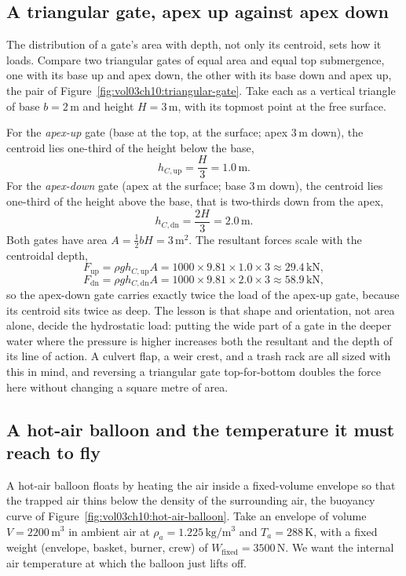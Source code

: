 \subsection{A triangular gate, apex up against apex down}

The distribution of a gate's area with depth, not only its centroid, sets
how it loads. Compare two triangular gates of equal area and equal top
submergence, one with its base up and apex down, the other with its base
down and apex up, the pair of Figure~\ref{fig:vol03ch10:triangular-gate}.
Take each as a vertical triangle of base $b = 2\,\si{\meter}$ and height
$H = 3\,\si{\meter}$, with its topmost point at the free surface.

For the \emph{apex-up} gate (base at the top, at the surface; apex $3\,\si{
\meter}$ down), the centroid lies one-third of the height below the base,
\[
h_{C,\text{up}} = \frac{H}{3} = 1.0\,\si{\meter}.
\]
For the \emph{apex-down} gate (apex at the surface; base $3\,\si{\meter}$
down), the centroid lies one-third of the height above the base, that is
two-thirds down from the apex,
\[
h_{C,\text{dn}} = \frac{2H}{3} = 2.0\,\si{\meter}.
\]
Both gates have area $A = \tfrac12 b H = 3\,\text{m}^2$. The resultant
forces scale with the centroidal depth,
\[
F_{\text{up}} = \rho g h_{C,\text{up}} A
= 1000 \times 9.81 \times 1.0 \times 3 \approx 29.4\,\text{kN},
\]
\[
F_{\text{dn}} = \rho g h_{C,\text{dn}} A
= 1000 \times 9.81 \times 2.0 \times 3 \approx 58.9\,\text{kN},
\]
so the apex-down gate carries exactly twice the load of the apex-up gate,
because its centroid sits twice as deep. The lesson is that shape and
orientation, not area alone, decide the hydrostatic load: putting the wide
part of a gate in the deeper water where the pressure is higher increases
both the resultant and the depth of its line of action. A culvert flap, a
weir crest, and a trash rack are all sized with this in mind, and reversing
a triangular gate top-for-bottom doubles the force here without changing a
square metre of area.



\subsection{A hot-air balloon and the temperature it must reach to fly}

A hot-air balloon floats by heating the air inside a fixed-volume envelope
so that the trapped air thins below the density of the surrounding air, the
buoyancy curve of Figure~\ref{fig:vol03ch10:hot-air-balloon}. Take an
envelope of volume $V = 2200\,\text{m}^3$ in ambient air at $\rho_a =
1.225\,\si{\kilogram\per\meter\cubed}$ and $T_a = 288\,\text{K}$, with a
fixed weight (envelope, basket, burner, crew) of $W_{\text{fixed}} =
3500\,\text{N}$. We want the internal air temperature at which the balloon
just lifts off.

